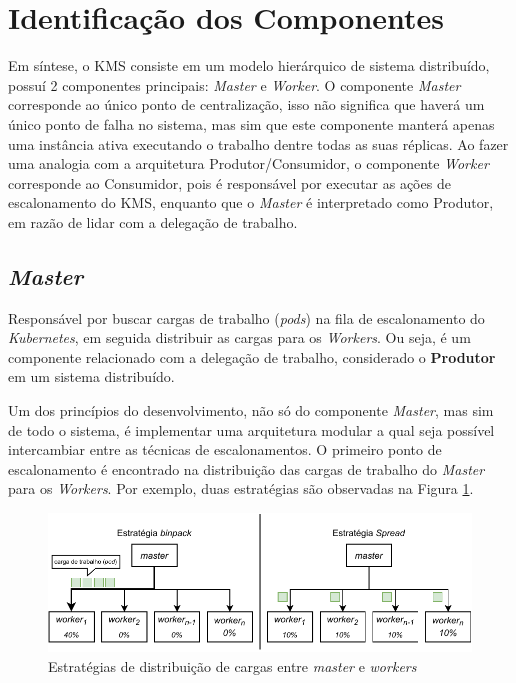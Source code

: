 \section{Identificação dos Componentes}

Em síntese, o \ac{KMS} consiste em um modelo hierárquico de sistema distribuído, possuí 2 componentes principais: \textit{Master} e \textit{Worker}. O componente \textit{Master} corresponde ao único ponto de centralização, isso não significa que haverá um único ponto de falha no sistema, mas sim que este componente manterá apenas uma instância ativa executando o trabalho dentre todas as suas réplicas. Ao fazer uma analogia com a arquitetura Produtor/Consumidor, o componente \textit{Worker} corresponde ao Consumidor, pois é responsável por executar as ações de escalonamento do \ac{KMS}, enquanto que o \textit{Master} é interpretado como Produtor, em razão de lidar com a delegação de trabalho.



\subsection{\textit{Master}}

Responsável por buscar cargas de trabalho (\textit{pods}) na fila de escalonamento do \textit{Kubernetes}, em seguida distribuir as cargas para os \textit{Workers}.  Ou seja, é um componente relacionado com a delegação de trabalho, considerado o \textbf{Produtor} em um sistema distribuído.

Um dos princípios do desenvolvimento, não só do componente \textit{Master}, mas sim de todo o sistema, é implementar uma arquitetura modular a qual seja possível intercambiar entre as técnicas de escalonamentos. O primeiro ponto de escalonamento é encontrado na distribuição das cargas de trabalho do \textit{Master} para os \textit{Workers}. Por exemplo, duas estratégias são observadas na Figura \ref{fig:distribuicao_cargas}.

\begin{figure}[h!]
	\caption{\label{fig:distribuicao_cargas} Estratégias de distribuição de cargas entre \textit{master} e \textit{workers}}
	\centering
		\includegraphics[width=\linewidth]{assets/distribuicao-trabalho.pdf}
\end{figure}

